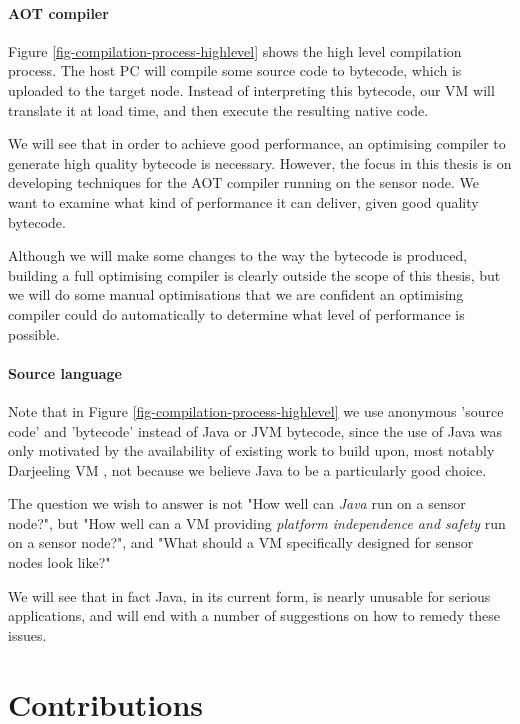 \paragraph{AOT compiler}
Figure \ref{fig-compilation-process-highlevel} shows the high level compilation process. The host PC will compile some source code to bytecode, which is uploaded to the target node. Instead of interpreting this bytecode, our VM will translate it at load time, and then execute the resulting native code.

We will see that in order to achieve good performance, an optimising compiler to generate high quality bytecode is necessary. However, the focus in this thesis is on developing techniques for the AOT compiler running on the sensor node. We want to examine what kind of performance it can deliver, given good quality bytecode.

Although we will make some changes to the way the bytecode is produced, building a full optimising compiler is clearly outside the scope of this thesis, but we will do some manual optimisations that we are confident an optimising compiler could do automatically to determine what level of performance is possible.

\paragraph{Source language}
Note that in Figure \ref{fig-compilation-process-highlevel} we use anonymous 'source code' and 'bytecode' instead of Java or JVM bytecode, since the use of Java was only motivated by the availability of existing work to build upon, most notably Darjeeling VM \cite{Brouwers:2009cj}, not because we believe Java to be a particularly good choice.

The question we wish to answer is not "How well can \emph{Java} run on a sensor node?", but "How well can a VM providing \emph{platform independence and safety} run on a sensor node?", and "What should a VM specifically designed for sensor nodes look like?"

We will see that in fact Java, in its current form, is nearly unusable for serious applications, and will end with a number of suggestions on how to remedy these issues.


\section{Contributions}

